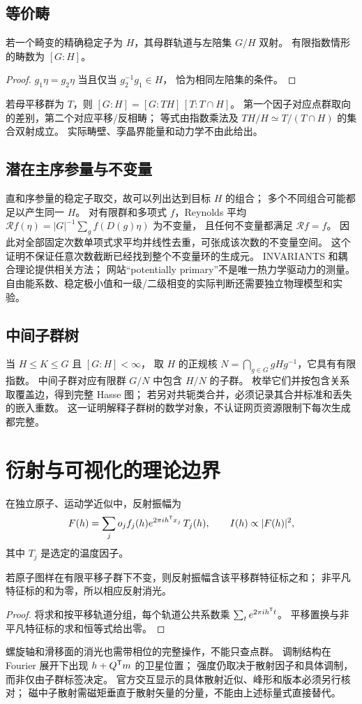 \subsection{等价畴}
\begin{theorem}[畴与陪集]
若一个畸变的精确稳定子为 $H$，其母群轨道与左陪集 $G/H$ 双射。
有限指数情形的畴数为 $[G:H]$。
\end{theorem}
\begin{proof}
$g_1\eta=g_2\eta$ 当且仅当 $g_2^{-1}g_1\in H$，
恰为相同左陪集的条件。
\end{proof}
若母平移群为 $T$，则
$[G:H]=[G:TH]\,[T:T\cap H]$。
第一个因子对应点群取向的差别，第二个对应平移/反相畴；
等式由指数乘法及 $TH/H\simeq T/(T\cap H)$ 的集合双射成立。
实际畴壁、孪晶界能量和动力学不由此给出。

\subsection{潜在主序参量与不变量}
直和序参量的稳定子取交，故可以列出达到目标 $H$ 的组合；
多个不同组合可能都足以产生同一 $H$。
对有限群和多项式 $f$，Reynolds 平均
$\mathcal R f(\eta)=|G|^{-1}\sum_g f(D(g)\eta)$ 为不变量，
且任何不变量都满足 $\mathcal R f=f$。
因此对全部固定次数单项式求平均并线性去重，可张成该次数的不变量空间。
这个证明不保证任意次数截断已经找到整个不变量环的生成元。
INVARIANTS 和耦合理论提供相关方法\citep{Invariants2003,Coupled1991}；
网站“potentially primary”不是唯一热力学驱动力的测量。
自由能系数、稳定极小值和一级/二级相变的实际判断还需要独立物理模型和实验。

\subsection{中间子群树}
当 $H\leq K\leq G$ 且 $[G:H]<\infty$，
取 $H$ 的正规核 $N=\bigcap_{g\in G}gHg^{-1}$，它具有有限指数。
中间子群对应有限群 $G/N$ 中包含 $H/N$ 的子群。
枚举它们并按包含关系取覆盖边，得到完整 Hasse 图；
若另对共轭类合并，必须记录其合并标准和丢失的嵌入重数。
这一证明解释子群树的数学对象，不认证网页资源限制下每次生成都完整。

\section{衍射与可视化的理论边界}\label{sec:diffraction}
在独立原子、运动学近似中，反射振幅为
\[
 F(h)=\sum_j o_j f_j(h)e^{2\pi i h^\mathsf T x_j}\,T_j(h),
 \qquad I(h)\propto |F(h)|^2,
\]
其中 $T_j$ 是选定的温度因子。
\begin{proposition}[平移消光]
若原子图样在有限平移子群下不变，则反射振幅含该平移群特征标之和；
非平凡特征标的和为零，所以相应反射消光。
\end{proposition}
\begin{proof}
将求和按平移轨道分组，每个轨道公共系数乘
$\sum_t e^{2\pi i h^\mathsf T t}$。
平移置换与非平凡特征标的求和恒等式给出零。
\end{proof}
螺旋轴和滑移面的消光也需带相位的完整操作，不能只查点群。
调制结构在 Fourier 展开下出现 $h+Q^\mathsf T m$ 的卫星位置；
强度仍取决于散射因子和具体调制，而非仅由子群标签决定。
官方交互显示的具体散射近似、峰形和版本必须另行核对\citep{OfficialHelp}；
磁中子散射需磁矩垂直于散射矢量的分量，不能由上述标量式直接替代。

